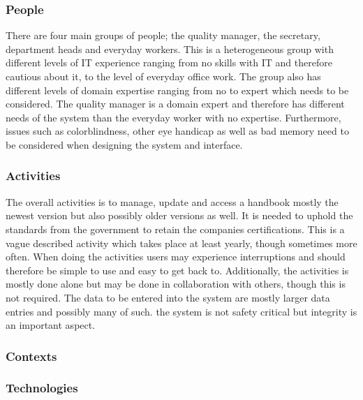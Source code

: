 \subsubsection*{People}

There are four main groups of people; the quality manager, the secretary, department heads and everyday workers.
This is a heterogeneous group with different levels of IT experience ranging from no skills with IT and therefore cautious about it, to the level of everyday office work.
The group also has different levels of domain expertise ranging from no to expert which needs to be considered. The quality manager is a domain expert and therefore has different needs of the system than the everyday worker with no expertise.
\newline
Furthermore, issues such as colorblindness, other eye handicap as well as bad memory need to be considered when designing the system and interface.


\subsubsection*{Activities}
The overall activities is to manage, update and access a handbook mostly the newest version but also possibly older versions as well. It is needed to uphold the standards from the government to retain the companies certifications.
This is a vague described activity 
which takes place at least yearly, though sometimes more often.
When doing the activities users may experience interruptions and should therefore be simple to use and easy to get back to.
Additionally, the activities is mostly done alone but may be done in collaboration with others, though this is not required.
\newline
The data to be entered into the system are mostly larger data entries and possibly many of such.
the system is not safety critical but integrity is an important aspect.

\subsubsection*{Contexts}


\subsubsection*{Technologies}














